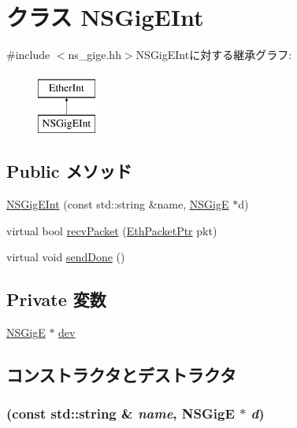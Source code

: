 \hypertarget{classNSGigEInt}{
\section{クラス NSGigEInt}
\label{classNSGigEInt}
}


{\ttfamily \#include $<$ns\_\-gige.hh$>$}NSGigEIntに対する継承グラフ:\begin{figure}[H]
\begin{center}
\leavevmode
\includegraphics[height=2cm]{classNSGigEInt}
\end{center}
\end{figure}
\subsection*{Public メソッド}
\begin{DoxyCompactItemize}
\item 
\hyperlink{classNSGigEInt_a9c43a6a105727464463336f634d0dd35}{NSGigEInt} (const std::string \&name, \hyperlink{classNSGigE}{NSGigE} $\ast$d)
\item 
virtual bool \hyperlink{classNSGigEInt_a9bd96a108d6f58f140c9f7d83726eebe}{recvPacket} (\hyperlink{classRefCountingPtr}{EthPacketPtr} pkt)
\item 
virtual void \hyperlink{classNSGigEInt_a967489e0b2900f4b12d99e6257d24dbe}{sendDone} ()
\end{DoxyCompactItemize}
\subsection*{Private 変数}
\begin{DoxyCompactItemize}
\item 
\hyperlink{classNSGigE}{NSGigE} $\ast$ \hyperlink{classNSGigEInt_a04e0517c9b37f7d4c6b3d16d5521c536}{dev}
\end{DoxyCompactItemize}


\subsection{コンストラクタとデストラクタ}
\hypertarget{classNSGigEInt_a9c43a6a105727464463336f634d0dd35}{
\subsubsection[{NSGigEInt}]{ (const std::string \& {\em name}, \/  {\bf NSGigE} $\ast$ {\em d})}}
\label{classNSGigEInt_a9c43a6a105727464463336f634d0dd35}



